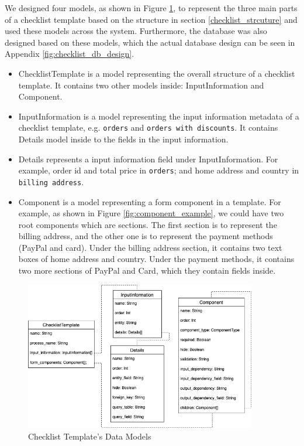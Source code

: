 We designed four models, as shown in Figure \ref{fig:data_models}, to represent the three main parts of a checklist template based on the structure in section \ref{checklist_strcuture} and used these models across the system. Furthermore, the database was also designed based on these models, which the actual database design can be seen in Appendix \ref{fig:checklist_db_design}.
\begin{itemize}
    \item ChecklistTemplate is a model representing the overall structure of a checklist template. It contains two other models inside: InputInformation and Component.
    \item InputInformation is a model representing the input information metadata of a checklist template, e.g. \verb!orders! and \verb!orders with discounts!. It contains Details model inside to the fields in the input information.
    \item Details represents a input information field under InputInformation. For example, order id and total price in \verb!orders!; and home address and country in \verb!billing address!.
    \item Component is a model representing a form component in a template. For example, as shown in Figure \ref{fig:component_example}, we could have two root components which are sections. The first section is to represent the billing address, and the other one is to represent the payment methods (PayPal and card). Under the billing address section, it contains two text boxes of home address and country. Under the payment methods, it contains two more sections of PayPal and Card, which they contain fields inside.
\end{itemize}


\begin{figure}[ht!]
    \centering
    \includegraphics[width=0.9\textwidth]{overleaf/images/data_models.png}
    \caption{Checklist Template's Data Models}
    \label{fig:data_models}
\end{figure}


